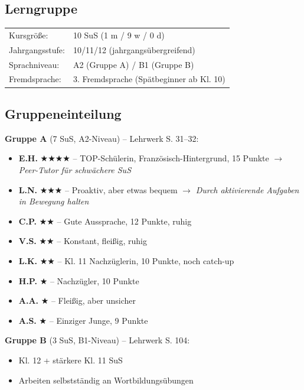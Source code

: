 \documentclass[11pt,a4paper]{article}
\newcommand{\jahrgangsstufe}{10/11/12}
\newcommand{\lerngruppengroesse}{10}
\newcommand{\maennlich}{1}
\newcommand{\weiblich}{9}
\newcommand{\divers}{0}
\begin{document}
\subsection{Lerngruppe}
\begin{tabular}{ll}
    Kursgröße: & \lerngruppengroesse{} SuS (\maennlich{} m / \weiblich{} w / \divers{} d) \\
    Jahrgangsstufe: & \jahrgangsstufe{} (jahrgangsübergreifend) \\
    Sprachniveau: & A2 (Gruppe A) / B1 (Gruppe B) \\
    Fremdsprache: & 3. Fremdsprache (Spätbeginner ab Kl. 10) \\
\end{tabular}

\subsection{Gruppeneinteilung}

\textbf{Gruppe A} (7 SuS, A2-Niveau) -- Lehrwerk S. 31--32:
\begin{itemize}
    \item \textbf{E.H.} $\bigstar\bigstar\bigstar\bigstar$ -- TOP-Schülerin, Französisch-Hintergrund, 15 Punkte $\rightarrow$ \textit{Peer-Tutor für schwächere SuS}
    \item \textbf{L.N.} $\bigstar\bigstar\bigstar$ -- Proaktiv, aber etwas bequem $\rightarrow$ \textit{Durch aktivierende Aufgaben in Bewegung halten}
    \item \textbf{C.P.} $\bigstar\bigstar$ -- Gute Aussprache, 12 Punkte, ruhig
    \item \textbf{V.S.} $\bigstar\bigstar$ -- Konstant, fleißig, ruhig
    \item \textbf{L.K.} $\bigstar\bigstar$ -- Kl. 11 Nachzüglerin, 10 Punkte, noch catch-up
    \item \textbf{H.P.} $\bigstar$ -- Nachzügler, 10 Punkte
    \item \textbf{A.A.} $\bigstar$ -- Fleißig, aber unsicher
    \item \textbf{A.S.} $\bigstar$ -- Einziger Junge, 9 Punkte
\end{itemize}

\textbf{Gruppe B} (3 SuS, B1-Niveau) -- Lehrwerk S. 104:
\begin{itemize}
    \item Kl. 12 + stärkere Kl. 11 SuS
    \item Arbeiten selbstständig an Wortbildungsübungen
\end{itemize}
\end{document}
